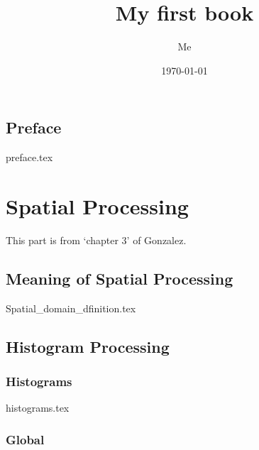 \documentclass{book}
\title{My first book}
\author{Me}
\date{\today}
\begin{document}

\maketitle

\frontmatter

\tableofcontents

\listoffigures

\chapter{Preface}
{preface.tex}

\mainmatter
\part{Spatial Processing}
This part is from `chapter 3' of Gonzalez.

\chapter{Meaning of Spatial Processing}

{Spatial_domain_dfinition.tex}


\chapter{Histogram Processing}

\section{Histograms}
{histograms.tex}

\section{Global}
\end{document}
